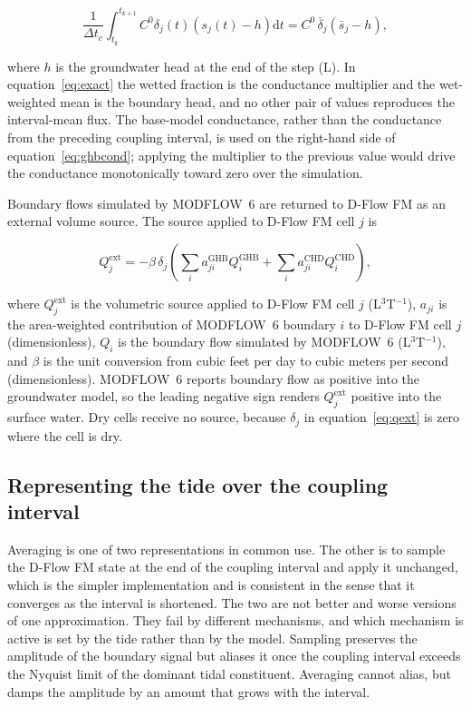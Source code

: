 \documentclass[preprint,authoryear,11pt]{elsarticle}
\begin{document}
\begin{equation}
  \frac{1}{\Delta t_{c}} \int_{t_{k}}^{t_{k+1}} C^{0} \delta_{j}(t)
      \left( s_{j}(t) - h \right) \mathrm{d}t
    = C^{0} \, \bar{\delta}_{j} \left( \bar{s}_{j} - h \right) ,
  \label{eq:exact}
\end{equation}

\noindent where $h$ is the groundwater head at the end of the step (L). In equation~\ref{eq:exact} the wetted fraction is the conductance multiplier and the wet-weighted mean is the boundary head, and no other pair of values reproduces the interval-mean flux. The base-model conductance, rather than the conductance from the preceding coupling interval, is used on the right-hand side of equation~\ref{eq:ghbcond}; applying the multiplier to the previous value would drive the conductance monotonically toward zero over the simulation.

Boundary flows simulated by MODFLOW~6 are returned to D-Flow FM as an external volume source. The source applied to D-Flow FM cell $j$ is

\begin{equation}
  Q_{j}^{\mathrm{ext}} = -\beta \, \delta_{j}
    \left( \sum_{i} a_{ji}^{\mathrm{GHB}} Q_{i}^{\mathrm{GHB}}
         + \sum_{i} a_{ji}^{\mathrm{CHD}} Q_{i}^{\mathrm{CHD}} \right) ,
  \label{eq:qext}
\end{equation}

\noindent where $Q_{j}^{\mathrm{ext}}$ is the volumetric source applied to D-Flow FM cell $j$ (L$^{3}$T$^{-1}$), $a_{ji}$ is the area-weighted contribution of MODFLOW~6 boundary $i$ to D-Flow FM cell $j$ (dimensionless), $Q_{i}$ is the boundary flow simulated by MODFLOW~6 (L$^{3}$T$^{-1}$), and $\beta$ is the unit conversion from cubic feet per day to cubic meters per second (dimensionless). MODFLOW~6 reports boundary flow as positive into the groundwater model, so the leading negative sign renders $Q_{j}^{\mathrm{ext}}$ positive into the surface water. Dry cells receive no source, because $\delta_{j}$ in equation~\ref{eq:qext} is zero where the cell is dry.

\subsection{Representing the tide over the coupling interval}
\label{sec:reduction}

Averaging is one of two representations in common use. The other is to sample the D-Flow FM state at the end of the coupling interval and apply it unchanged, which is the simpler implementation and is consistent in the sense that it converges as the interval is shortened. The two are not better and worse versions of one approximation. They fail by different mechanisms, and which mechanism is active is set by the tide rather than by the model. Sampling preserves the amplitude of the boundary signal but aliases it once the coupling interval exceeds the Nyquist limit of the dominant tidal constituent. Averaging cannot alias, but damps the amplitude by an amount that grows with the interval.
\end{document}

